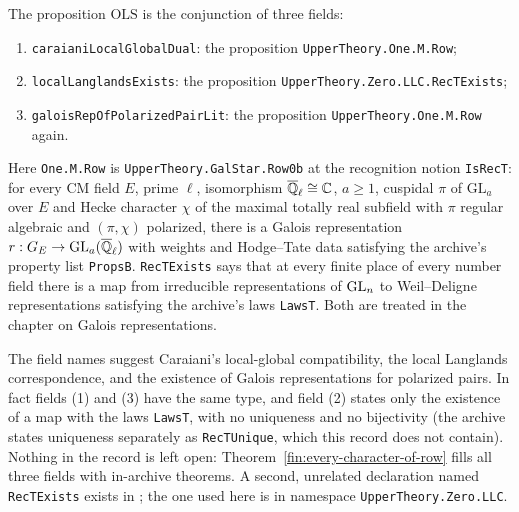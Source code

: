 \begin{definition}\label{fin:open-lit}
The proposition $\mathrm{OLS}$ is the conjunction of three fields:
\begin{enumerate}
\item \texttt{caraianiLocalGlobalDual}: the proposition \texttt{UpperTheory.One.M.Row};
\item \texttt{localLanglandsExists}: the proposition \texttt{UpperTheory.Zero.LLC.RecTExists};
\item \texttt{galoisRepOfPolarizedPairLit}: the proposition \texttt{UpperTheory.One.M.Row} again.
\end{enumerate}
Here \texttt{One.M.Row} is \texttt{UpperTheory.GalStar.Row0b} at the recognition
notion \texttt{IsRecT}: for every CM field $E$, prime $\ell$, isomorphism
$\overline{\mathbb{Q}}_{\ell}\cong\mathbb{C}$, $a\ge1$, cuspidal $\pi$ of $\mathrm{GL}_a$ over $E$
and Hecke character $\chi$ of the maximal totally real subfield with $\pi$
regular algebraic and $(\pi,\chi)$ polarized, there is a Galois representation
$r:G_E\to\mathrm{GL}_a(\overline{\mathbb{Q}}_{\ell})$ with weights and Hodge--Tate data satisfying
the archive's property list \texttt{PropsB}. \texttt{RecTExists} says that at
every finite place of every number field there is a map from irreducible
representations of $\mathrm{GL}_n$ to Weil--Deligne representations satisfying the
archive's laws \texttt{LawsT}. Both are treated in the chapter on Galois
representations.
\end{definition}

\begin{remark}\label{fin:rem-olit-names}
The field names suggest Caraiani's local-global compatibility, the local
Langlands correspondence, and the existence of Galois representations for
polarized pairs. In fact fields (1) and (3) have the same type, and field (2)
states only the existence of a map with the laws \texttt{LawsT}, with no
uniqueness and no bijectivity (the archive states uniqueness separately as
\texttt{RecTUnique}, which this record does not contain). Nothing in the record
is left open: Theorem~\ref{fin:every-character-of-row} fills all three fields
with in-archive theorems. A second, unrelated declaration named
\texttt{RecTExists} exists in
;
the one used here is in namespace \texttt{UpperTheory.Zero.LLC}.
\end{remark}

